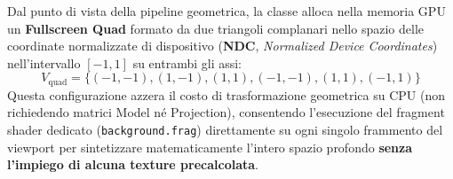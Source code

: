 \documentclass[11pt,a4paper]{article}
\begin{document}
Dal punto di vista della pipeline geometrica, la classe alloca nella memoria GPU un \textbf{Fullscreen Quad} formato da due triangoli complanari nello spazio delle coordinate normalizzate di dispositivo (\textbf{NDC}, \textit{Normalized Device Coordinates}) nell'intervallo $[-1, 1]$ su entrambi gli assi:
\begin{equation}
V_{\text{quad}} = \{ (-1,-1), (1,-1), (1,1), (-1,-1), (1,1), (-1,1) \}
\end{equation}
Questa configurazione azzera il costo di trasformazione geometrica su CPU (non richiedendo matrici Model né Projection), consentendo l'esecuzione del fragment shader dedicato (\texttt{background.frag}) direttamente su ogni singolo frammento del viewport per sintetizzare matematicamente l'intero spazio profondo \textbf{senza l'impiego di alcuna texture precalcolata}.
\end{document}
